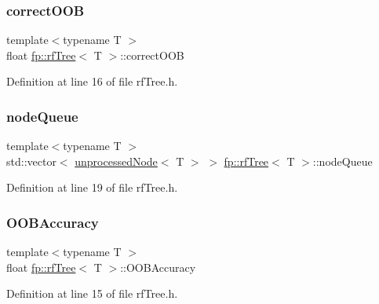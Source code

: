 \subsubsection{\texorpdfstring{correct\+O\+OB}{correctOOB}}
{\footnotesize\ttfamily template$<$typename T $>$ \\
float \hyperlink{classfp_1_1rfTree}{fp\+::rf\+Tree}$<$ T $>$\+::correct\+O\+OB\hspace{0.3cm}{\ttfamily [protected]}}



Definition at line 16 of file rf\+Tree.\+h.

\mbox{\label{classfp_1_1rfTree_af72d0a2f930fd480dfb4858885c2df23}} 
\subsubsection{\texorpdfstring{node\+Queue}{nodeQueue}}
{\footnotesize\ttfamily template$<$typename T $>$ \\
std\+::vector$<$ \hyperlink{classfp_1_1unprocessedNode}{unprocessed\+Node}$<$ T $>$ $>$ \hyperlink{classfp_1_1rfTree}{fp\+::rf\+Tree}$<$ T $>$\+::node\+Queue\hspace{0.3cm}{\ttfamily [protected]}}



Definition at line 19 of file rf\+Tree.\+h.

\mbox{\label{classfp_1_1rfTree_a673f85d4df6f292a1819351c092a07e1}} 
\subsubsection{\texorpdfstring{O\+O\+B\+Accuracy}{OOBAccuracy}}
{\footnotesize\ttfamily template$<$typename T $>$ \\
float \hyperlink{classfp_1_1rfTree}{fp\+::rf\+Tree}$<$ T $>$\+::O\+O\+B\+Accuracy\hspace{0.3cm}{\ttfamily [protected]}}



Definition at line 15 of file rf\+Tree.\+h.

\mbox{\label{classfp_1_1rfTree_aa200dc228adc20c12e514364d2b674df}} 
